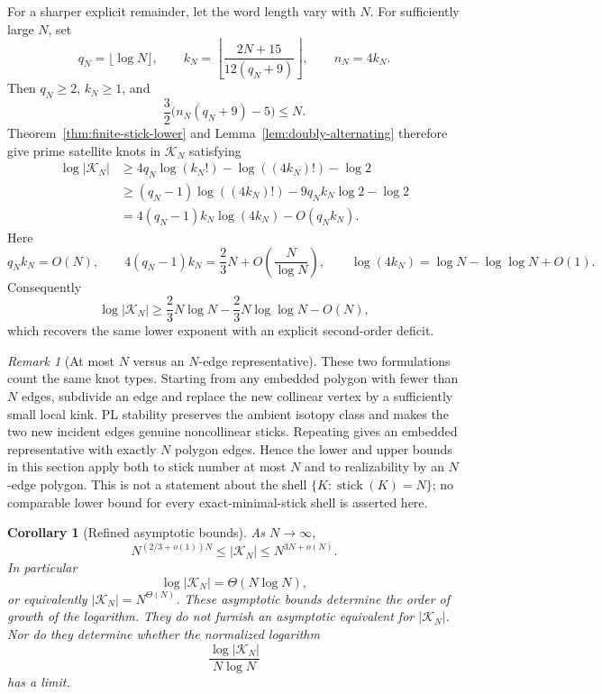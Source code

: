 \documentclass[11pt]{article}
\newtheorem{corollary}{Corollary}
\theoremstyle{remark}
\newtheorem{remark}{Remark}
\theoremstyle{plain}
\newcommand{\Kcal}{\mathcal{K}}
\begin{document}
For a sharper explicit remainder, let the word length vary with \(N\).  For
sufficiently large \(N\), set
\[
    q_N=\lfloor\log N\rfloor,
    \qquad
    k_N=\left\lfloor
       \frac{2N+15}{12(q_N+9)}
    \right\rfloor,
    \qquad n_N=4k_N.
\]
Then \(q_N\ge2\), \(k_N\ge1\), and
\[
 \frac32\bigl(n_N(q_N+9)-5\bigr)\le N.
\]
Theorem~\ref{thm:finite-stick-lower} and Lemma~\ref{lem:doubly-alternating}
therefore give prime satellite knots in \(\Kcal_N\) satisfying
\[
 \begin{aligned}
 \log|\Kcal_N|
 &\ge
   4q_N\log(k_N!)-\log((4k_N)!)-\log2 \\
 &\ge (q_N-1)\log((4k_N)!)-9q_Nk_N\log2-\log2 \\
 &=4(q_N-1)k_N\log(4k_N)-O(q_Nk_N).
 \end{aligned}
\]
Here
\[
 q_Nk_N=O(N),\qquad
 4(q_N-1)k_N=\frac23N+O\!\left(\frac{N}{\log N}\right),
 \qquad
 \log(4k_N)=\log N-\log\log N+O(1).
\]
Consequently
\[
    \log|\Kcal_N|
       \ge \frac23N\log N-\frac23N\log\log N-O(N),
\]
which recovers the same lower exponent with an explicit second-order deficit.

\begin{remark}[At most \(N\) versus an \(N\)-edge representative]\label{rem:exact-N}
These two formulations count the same knot types.  Starting from any
embedded polygon with fewer than \(N\) edges, subdivide an edge and replace
the new collinear vertex by a sufficiently small local kink.  PL stability
preserves the ambient isotopy class and makes the two new incident edges
genuine noncollinear sticks.  Repeating gives an embedded representative
with exactly \(N\) polygon edges.  Hence the lower and upper bounds in this section
apply both to stick number at most \(N\) and to realizability by an
\(N\)-edge polygon.  This is not a statement about the shell
\(\{K:\operatorname{stick}(K)=N\}\); no comparable lower bound for every
exact-minimal-stick shell is asserted here.
\end{remark}

\begin{corollary}[Refined asymptotic bounds]
As \(N\to\infty\),
\[
 N^{(2/3+o(1))N}
 \le |\Kcal_N|
 \le N^{3N+o(N)}.
\]
In particular
\[
 \log|\Kcal_N|=\Theta(N\log N),
\]
or equivalently \(|\Kcal_N|=N^{\Theta(N)}\).  These asymptotic bounds determine
the order of growth of the logarithm.  They do not furnish an asymptotic
equivalent for \(|\Kcal_N|\).  Nor do they determine whether the normalized
logarithm
\[
    \frac{\log|\Kcal_N|}{N\log N}
\]
has a limit.
\end{corollary}
\end{document}
